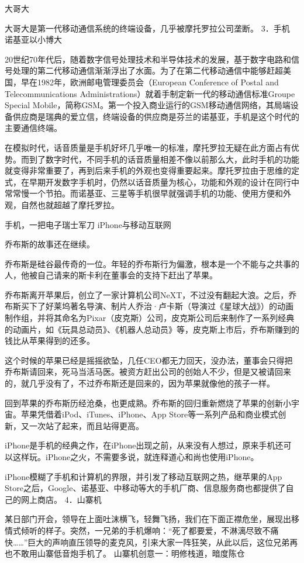 \documentclass[12pt,UTF8]{ctexbook}
\begin{document}
大哥大

大哥大是第一代移动通信系统的终端设备，几乎被摩托罗拉公司垄断。
3．手机
诺基亚以小博大

20世纪70年代后，随着数字信号处理技术和半导体技术的发展，基于数字电路和信号处理的第二代移动通信渐渐浮出了水面。为了在第二代移动通信中能够赶超美国，早在1982年，欧洲邮电管理委员会（European Conference of Postal and Telecommunications Administrations）就着手制定新一代的移动通信标准Groupe Special Mobile，简称GSM。第一个投入商业运行的GSM移动通信网络，其局端设备供应商是瑞典的爱立信，终端设备的供应商是芬兰的诺基亚，手机是这个时代的主要通信终端。

在模拟时代，话音质量是手机好坏几乎唯一的标准，摩托罗拉无疑在此方面占有优势。而到了数字时代，不同手机的话音质量相差不像以前那么大，此时手机的功能就变得非常重要了，再到后来手机的外观也变得重要起来。摩托罗拉由于思维的定式，在早期开发数字手机时，仍然以话音质量为核心，功能和外观的设计在同行中常常慢一个节拍。而诺基亚、三星等手机很早就强调手机的功能、使用方便和外观，自然也就超越了摩托罗拉。

手机，一把电子瑞士军刀
iPhone与移动互联网

乔布斯的故事还在继续。

乔布斯是硅谷最传奇的一位。年轻的乔布斯行为偏激，根本是一个不能与之共事的人，他被自己请来的斯卡利在董事会的支持下赶出了苹果。

乔布斯离开苹果后，创立了一家计算机公司NeXT，不过没有翻起大浪。之后，乔布斯买下了好莱坞著名导演、制片人乔治·卢卡斯（导演过《星球大战》）的动画制作组，并将其命名为Pixar（皮克斯）公司，皮克斯公司后来制作了一系列经典的动画片，如《玩具总动员》、《机器人总动员》等，皮克斯上市后，乔布斯赚到的钱比从苹果得到的还多。

这个时候的苹果已经是摇摇欲坠，几任CEO都无力回天，没办法，董事会只得把乔布斯请回来，死马当活马医。被资方赶出公司的创始人不少，但是又被请回来的，就几乎没有了，不过乔布斯还是回来的，因为苹果就像他的孩子一样。

回到苹果的乔布斯历经沧桑，也更成熟。乔布斯的回归重新燃烧了苹果的创新小宇宙。苹果凭借着iPod、iTunes、iPhone、App Store等一系列产品和商业模式创新，又一次站了起来，而且站得更高。

iPhone是手机的经典之作，在iPhone出现之前，从来没有人想过，原来手机还可以这样玩。iPhone之火，不需要多说，就连释道心和尚也使用iPhone。

iPhone模糊了手机和计算机的界限，并引发了移动互联网之热，继苹果的App Store之后，Google、诺基亚、中移动等大的手机厂商、信息服务商也都提供了自己的网上商店。
4．山寨机

某日部门开会，领导在上面吐沫横飞，轻舞飞扬，我们在下面正襟危坐，展现出移情式倾听的样子。突然，一兄弟的手机爆响：“死了都要爱，不淋漓尽致不痛快……”巨大的声响直压领导的麦克风，引来大家一阵狂笑，从此以后，这位兄弟再也不敢用山寨低音炮手机了。
山寨机创意一：明修栈道，暗度陈仓
\end{document}
